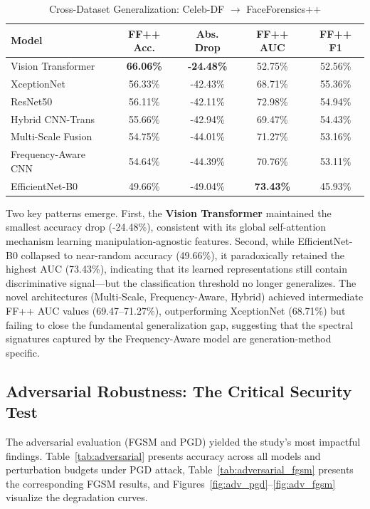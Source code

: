 \documentclass[runningheads]{llncs}
\begin{document}
\begin{table}[H]
\caption{Cross-Dataset Generalization: Celeb-DF $\rightarrow$ FaceForensics++}
\label{tab:cross_dataset}
\centering
\small
\setlength{\tabcolsep}{6pt}
\begin{tabular}{lcccc}
\toprule
\textbf{Model} & \textbf{FF++ Acc.} & \textbf{Abs. Drop} & \textbf{FF++ AUC} & \textbf{FF++ F1} \\
\midrule
Vision Transformer   & \textbf{66.06\%} & \textbf{-24.48\%} & 52.75\% & 52.56\% \\
XceptionNet          & 56.33\% & -42.43\% & 68.71\% & 55.36\% \\
ResNet50             & 56.11\% & -42.11\% & 72.98\% & 54.94\% \\
Hybrid CNN-Trans     & 55.66\% & -42.94\% & 69.47\% & 54.43\% \\
Multi-Scale Fusion   & 54.75\% & -44.01\% & 71.27\% & 53.16\% \\
Frequency-Aware CNN  & 54.64\% & -44.39\% & 70.76\% & 53.11\% \\
EfficientNet-B0      & 49.66\% & -49.04\% & \textbf{73.43\%} & 45.93\% \\
\bottomrule
\end{tabular}
\end{table}

Two key patterns emerge. First, the \textbf{Vision Transformer} maintained the smallest accuracy drop (-24.48\%), consistent with its global self-attention mechanism learning manipulation-agnostic features. Second, while EfficientNet-B0 collapsed to near-random accuracy (49.66\%), it paradoxically retained the highest AUC (73.43\%), indicating that its learned representations still contain discriminative signal---but the classification threshold no longer generalizes. The novel architectures (Multi-Scale, Frequency-Aware, Hybrid) achieved intermediate FF++ AUC values (69.47--71.27\%), outperforming XceptionNet (68.71\%) but failing to close the fundamental generalization gap, suggesting that the spectral signatures captured by the Frequency-Aware model are generation-method specific.

\subsection{Adversarial Robustness: The Critical Security Test}
The adversarial evaluation (FGSM and PGD) yielded the study's most impactful findings. Table~\ref{tab:adversarial} presents accuracy across all models and perturbation budgets under PGD attack, Table~\ref{tab:adversarial_fgsm} presents the corresponding FGSM results, and Figures~\ref{fig:adv_pgd}--\ref{fig:adv_fgsm} visualize the degradation curves.
\end{document}
